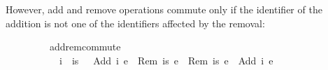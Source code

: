 \noindent However, add and remove operations commute only if the identifier of the addition is not one of the identifiers affected by the removal:
\vspace{0.275em}
\begin{isabellebody}
\ \ \ \ \ \ \ \ \ add{\isacharunderscore}rem{\isacharunderscore}commute{\isacharcolon}\isanewline
\ \ \ \ \ \ \ \ \ \ \ {\isachardoublequoteopen}i\ {\isasymnotin}\ is{\isachardoublequoteclose}\ \ \ {\isachardoublequoteopen}{\isasymlangle}Add\ i\ e{}{\isasymrangle}\ {\isasymrhd}\ {\isasymlangle}Rem\ is\ e{}{\isasymrangle}\ {\isacharequal}\ {\isasymlangle}Rem\ is\ e{}{\isasymrangle}\ {\isasymrhd}\ {\isasymlangle}Add\ i\ e{}{\isasymrangle}{\isachardoublequoteclose}
\end{isabellebody}
\vspace{0.275em}

